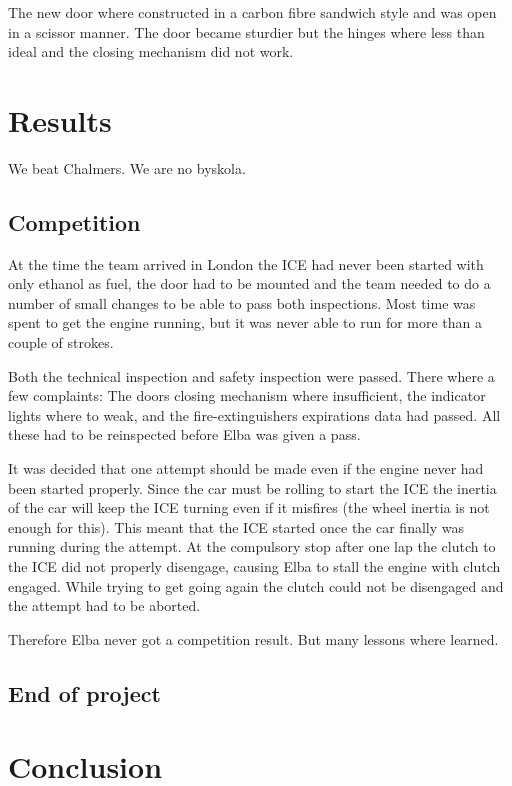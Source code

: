 The new door where constructed in a carbon fibre sandwich style and was open in
a scissor manner. The door became sturdier but the hinges where less than ideal
and the closing mechanism did not work.

\section{Results}
We beat Chalmers. We are no byskola.

\subsection{Competition}
At the time the team arrived in London the ICE had never been started with only ethanol as fuel, the door had to be mounted and the team needed to do a number of small changes to be able to pass both inspections. Most time was spent to get the engine running, but it was never able to run for more than a couple of strokes. 

Both the technical inspection and safety inspection were passed. There where a few complaints: The doors closing mechanism where insufficient, the indicator lights where to weak, and the fire-extinguishers expirations data had passed. All these had to be reinspected before Elba was given a pass.

It was decided that one attempt should be made even if the engine never had been started properly. Since the car must be rolling to start the ICE the inertia of the car will keep the ICE turning even if it misfires (the wheel inertia is not enough for this). This meant that the ICE started once the car finally was running during the attempt. %
At the compulsory stop after one lap the clutch to the ICE did not properly disengage, causing Elba to stall the engine with clutch engaged. While trying to get going again the clutch could not be disengaged and the attempt had to be aborted.

Therefore Elba never got a competition result. But many lessons where learned.

\subsection{End of project}

\section{Conclusion}
